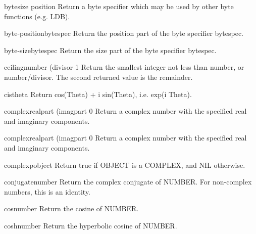 \begin{function}{byte}{size position}{}
  Return a byte specifier which may be used by other byte functions
  (e.g. LDB).
\end{function}

\begin{function}{byte-position}{bytespec}{}
  Return the position part of the byte specifier bytespec.
\end{function}

\begin{function}{byte-size}{bytespec}{}
  Return the size part of the byte specifier bytespec.
\end{function}

\begin{function}{ceiling}{number \op (divisor 1}{}
  Return the smallest integer not less than number, or number/divisor.
  The second returned value is the remainder.
\end{function}

\begin{function}{cis}{theta}{}
  Return cos(Theta) + i sin(Theta), i.e. exp(i Theta).
\end{function}

\begin{function}{complex}{realpart \op (imagpart 0}{}
  Return a complex number with the specified real and imaginary components.
\end{function}

\begin{class}{complex}{realpart \op (imagpart 0}{}
  Return a complex number with the specified real and imaginary components.
\end{class}

\begin{function}{complexp}{object}{}
  Return true if OBJECT is a COMPLEX, and NIL otherwise.
\end{function}

\begin{function}{conjugate}{number}{}
  Return the complex conjugate of NUMBER. For non-complex numbers, this is
  an identity.
\end{function}

\begin{function}{cos}{number}{}
  Return the cosine of NUMBER.
\end{function}

\begin{function}{cosh}{number}{}
  Return the hyperbolic cosine of NUMBER.
\end{function}

